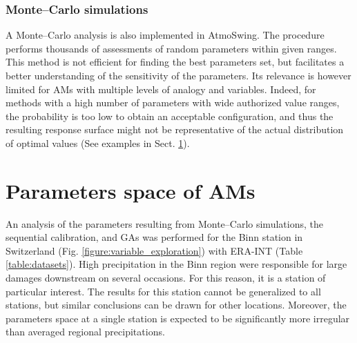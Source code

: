 \documentclass[gmdd]{copernicus}
\begin{document}
\subsubsection{Monte--Carlo simulations}
\label{sec:monte-carlo}

A Monte--Carlo analysis is also implemented in AtmoSwing. The procedure performs thousands of assessments of random parameters within given ranges. This method is not efficient for finding the best parameters set, but facilitates a better understanding of the sensitivity of the parameters. Its relevance is however limited for AMs with multiple levels of analogy and variables. Indeed, for methods with a high number of parameters with wide authorized value ranges, the probability is too low to obtain an acceptable configuration, and thus the resulting response surface might not be representative of the actual distribution of optimal values (See examples in Sect. \ref{sec:parameters-space}). 


\section{Parameters space of AMs}
\label{sec:parameters-space}

An analysis of the parameters resulting from Monte--Carlo simulations, the sequential calibration, and GAs was performed for the Binn station in Switzerland (Fig. \ref{figure:variable_exploration}) with ERA-INT (Table \ref{table:datasets}). High precipitation in the Binn region were responsible for large damages downstream on several occasions. For this reason, it is a station of particular interest. The results for this station cannot be generalized to all stations, but similar conclusions can be drawn for other locations. Moreover, the parameters space at a single station is expected to be significantly more irregular than averaged regional precipitations.
\end{document}
